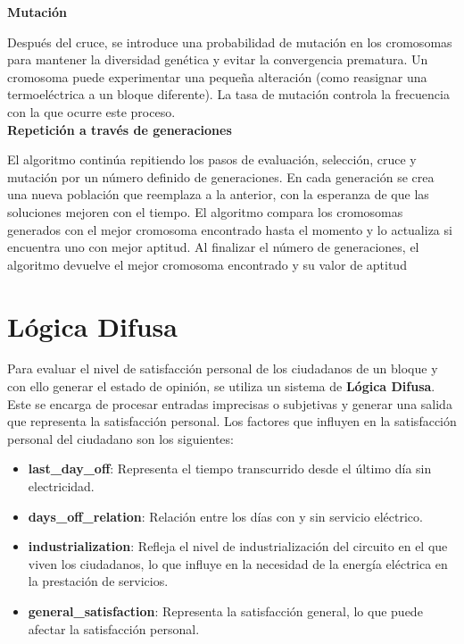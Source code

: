\documentclass[twocolumn, fontsize=10pt]{article}
\begin{document}
\textbf{Mutación}

Después del cruce, se introduce 
una probabilidad de mutación en los cromosomas para mantener la 
diversidad genética y evitar la convergencia prematura. 
Un cromosoma puede experimentar una pequeña alteración 
(como reasignar una termoeléctrica a un bloque diferente). 
La tasa de mutación controla la frecuencia con 
la que ocurre este proceso. \\


\textbf{Repetición a través de generaciones}

El algoritmo continúa repitiendo 
los pasos de evaluación, selección, cruce y mutación por un 
número definido de generaciones. En cada generación se crea 
una nueva población que reemplaza a la anterior, con la 
esperanza de que las soluciones mejoren con el tiempo. El 
algoritmo compara los cromosomas generados con el mejor 
cromosoma encontrado hasta el momento y lo actualiza si 
encuentra uno con mejor aptitud. Al finalizar el número de 
generaciones, el algoritmo devuelve el mejor cromosoma 
encontrado y su valor de aptitud

\section{Lógica Difusa}

Para evaluar el nivel de satisfacción personal de los ciudadanos de un bloque y con ello generar el estado de opinión,
se utiliza un sistema de \textbf{Lógica Difusa}. Este se encarga de procesar entradas 
imprecisas o subjetivas y generar una salida que representa 
la satisfacción personal. Los factores que influyen en la 
satisfacción personal del ciudadano son los siguientes: 
\begin{itemize}
  \item \textbf{last\_day\_off}: Representa el tiempo transcurrido desde el último día sin electricidad.
  \item \textbf{days\_off\_relation}: Relación entre los días con y sin servicio eléctrico.
  \item \textbf{industrialization}: Refleja el nivel de industrialización del circuito en el que viven los ciudadanos, lo que influye en la necesidad de la energía eléctrica en la prestación de servicios.
  \item \textbf{general\_satisfaction}: Representa la satisfacción general, lo que puede afectar la satisfacción personal.
\end{itemize}
\end{document}

